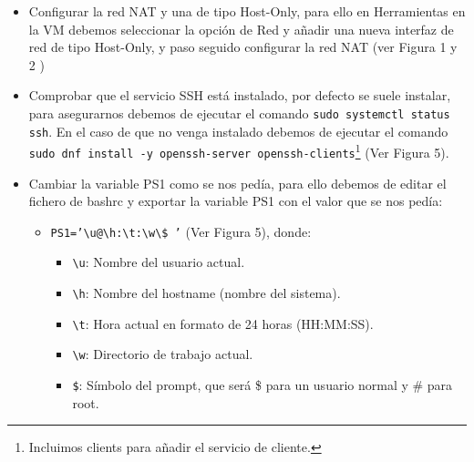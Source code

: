\begin{itemize}
    \item Configurar la red NAT y una de tipo Host-Only, para ello en Herramientas en la VM debemos seleccionar la opción de Red y añadir una nueva interfaz de red de tipo Host-Only, y paso seguido configurar la red NAT (ver Figura 1 y 2 )
    \item Comprobar que el servicio SSH está instalado, por defecto se suele instalar, para asegurarnos debemos de ejecutar el comando \texttt{sudo systemctl status ssh}. En el caso de que no venga instalado debemos de ejecutar el comando \texttt{sudo dnf install -y openssh-server openssh-clients}\footnote{Incluimos clients para añadir el servicio de cliente.} (Ver Figura 5).
    \item Cambiar la variable PS1 como se nos pedía, para ello debemos de editar el fichero de bashrc y exportar la variable PS1 con el valor que se nos pedía:
    \begin{itemize}
        \item \texttt{PS1='\textbackslash u@\textbackslash h:\textbackslash t:\textbackslash w\textbackslash\$ '} (Ver Figura 5), donde:
        \begin{itemize}
            \item \texttt{\textbackslash u}: Nombre del usuario actual.
            \item \texttt{\textbackslash h}: Nombre del hostname (nombre del sistema).
            \item \texttt{\textbackslash t}: Hora actual en formato de 24 horas (HH:MM:SS).
            \item \texttt{\textbackslash w}: Directorio de trabajo actual.
            \item \texttt{\$}: Símbolo del prompt, que será \$ para un usuario normal y \# para root.
        \end{itemize}
    \end{itemize}
\end{itemize}

